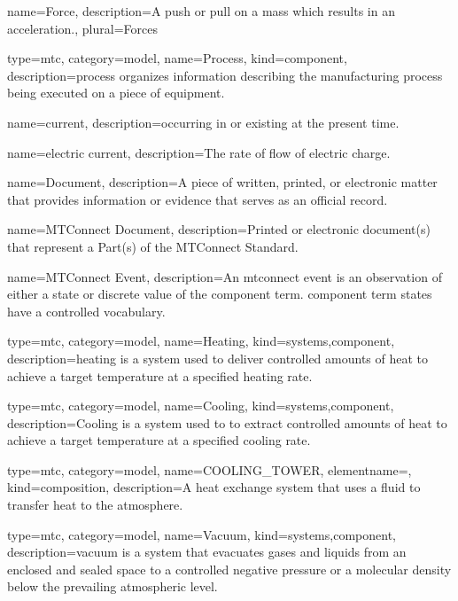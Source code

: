 {
  name={Force},
  description={A push or pull on a mass which results in an acceleration.},
  plural={Forces}
}

{
  type=mtc,
  category=model,
  name={Process},
  kind={component},
  description={\gls{process} \glspl{organize} information describing the manufacturing process being executed on a piece of equipment.}
}

{
  name={current},
  description={occurring in or existing at the present time.}
}

{
  name={electric current},
  description={The rate of flow of electric charge.}
}

{
  name={Document},
  description={A piece of written, printed, or electronic matter that provides information or evidence that serves as an official record.}
}

{
  name={MTConnect Document},
  description={Printed or electronic document(s) that represent a Part(s) of the MTConnect Standard.}
}

{
  name={MTConnect Event},
  description={An \gls{mtconnect event} is an \gls{observation} of either a state or discrete value of the \gls{component term}. \gls{component term} states \SHOULD have a controlled vocabulary.}
}


{
  type=mtc,
  category=model,
  name={Heating},
  kind={systems,component},
  description={\gls{heating} is a system used to deliver controlled amounts of heat to achieve a target temperature at a specified heating rate.}
}

{
  type=mtc,
  category=model,
  name={Cooling},
  kind={systems,component},
  description={\gls{Cooling} is a system used to to extract controlled amounts of heat to achieve a target temperature at a specified cooling rate.}
}

{
  type=mtc,
  category=model,
  name={COOLING\_TOWER},
  elementname=,
  kind={composition},
  description={A heat exchange system that uses a fluid to transfer heat to the atmosphere.}
}

{
  type=mtc,
  category=model,
  name={Vacuum},
  kind={systems,component},
  description={\gls{vacuum} is a system that evacuates gases and liquids from an enclosed and sealed space to a controlled negative pressure or a molecular density below the prevailing atmospheric level.}
}

